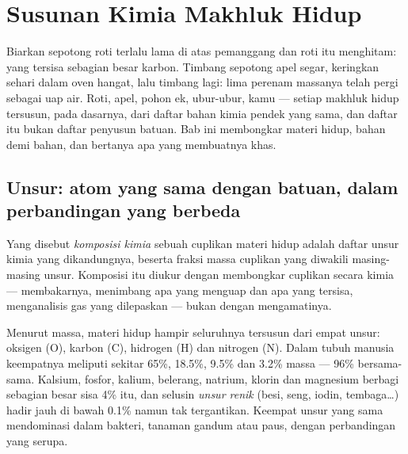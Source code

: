\chapter{Susunan Kimia Makhluk Hidup}\label{ch:g10:chemistry-of-life}

Biarkan sepotong roti terlalu lama di atas pemanggang dan roti itu
menghitam: yang tersisa sebagian besar karbon. Timbang sepotong apel
segar, keringkan sehari dalam oven hangat, lalu timbang lagi: lima
perenam massanya telah pergi sebagai uap air. Roti, apel, pohon ek,
ubur-ubur, kamu --- setiap makhluk hidup tersusun, pada dasarnya, dari
daftar bahan kimia pendek yang sama, dan daftar itu bukan daftar
penyusun batuan. Bab ini membongkar materi hidup, bahan demi bahan, dan
bertanya apa yang membuatnya khas.

\section{Unsur: atom yang sama dengan batuan, dalam perbandingan yang berbeda}

\begin{definition}\label{def:g10:chemistry-of-life:composition}
Yang disebut \emph{komposisi kimia} sebuah
cuplikan materi hidup adalah daftar unsur kimia yang dikandungnya,
beserta fraksi massa cuplikan yang diwakili masing-masing unsur.
Komposisi itu diukur dengan membongkar cuplikan secara kimia ---
membakarnya, menimbang apa yang menguap dan apa yang tersisa,
menganalisis gas yang dilepaskan --- bukan dengan mengamatinya.
\end{definition}

\begin{proposition}\label{prop:g10:chemistry-of-life:four}
Menurut massa, materi hidup hampir seluruhnya tersusun dari empat
unsur: oksigen (O), karbon (C), hidrogen (H) dan nitrogen (N). Dalam
tubuh manusia keempatnya meliputi sekitar 65\%, 18.5\%, 9.5\% dan
3.2\% massa --- 96\% bersama-sama. Kalsium, fosfor, kalium, belerang,
natrium, klorin dan magnesium berbagi sebagian besar sisa 4\% itu, dan
selusin \emph{unsur renik} (besi, seng, iodin, tembaga\dots)
hadir jauh di bawah 0.1\% namun tak tergantikan. Keempat unsur yang sama
mendominasi dalam bakteri, tanaman gandum atau paus, dengan
perbandingan yang serupa.
\end{proposition}
\admitted

